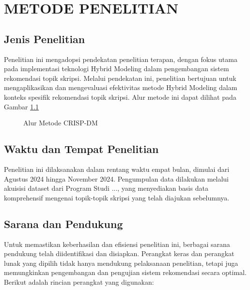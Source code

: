 \chapter{METODE PENELITIAN}

\section{Jenis Penelitian}
Penelitian ini mengadopsi pendekatan penelitian terapan, dengan fokus utama pada implementasi teknologi Hybrid Modeling dalam pengembangan sistem rekomendasi topik skripsi. Melalui pendekatan ini, penelitian bertujuan untuk mengaplikasikan dan mengevaluasi efektivitas metode Hybrid Modeling dalam konteks spesifik rekomendasi topik skripsi. Alur metode ini dapat dilihat pada Gambar \ref{fig:crisp-dm-overview}

\begin{figure}[H]
    \centering
    \caption{Alur Metode CRISP-DM \cite{IBM2022}}
    \label{fig:crisp-dm-overview}
\end{figure}

\section{Waktu dan Tempat Penelitian}
Penelitian ini dilaksanakan dalam rentang waktu empat bulan, dimulai dari Agustus 2024 hingga November 2024. Pengumpulan data dilakukan melalui akuisisi dataset dari Program Studi ..., yang menyediakan basis data komprehensif mengenai topik-topik skripsi yang telah diajukan sebelumnya.

\section{Sarana dan Pendukung}
Untuk memastikan keberhasilan dan efisiensi penelitian ini, berbagai sarana pendukung telah diidentifikasi dan disiapkan. Perangkat keras dan perangkat lunak yang dipilih tidak hanya mendukung pelaksanaan penelitian, tetapi juga memungkinkan pengembangan dan pengujian sistem rekomendasi secara optimal. Berikut adalah rincian perangkat yang digunakan:

